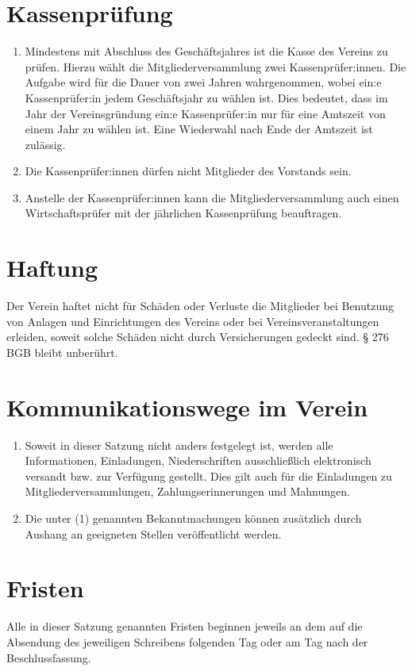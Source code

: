 \documentclass[12pt]{article}
\begin{document}
\section{Kassenprüfung}
\begin{enumerate}[label=(\arabic*)]
	\item Mindestens mit Abschluss des Geschäftsjahres ist die Kasse des Vereins zu prüfen. Hierzu wählt
	      die Mitgliederversammlung zwei Kassenprüfer:innen. Die Aufgabe wird für die Dauer von zwei Jahren
	      wahrgenommen, wobei ein:e Kassenprüfer:in jedem Geschäftsjahr zu wählen ist. Dies bedeutet,
	      dass im Jahr der Vereinsgründung ein:e Kassenprüfer:in nur für eine Amtszeit von einem Jahr zu
	      wählen ist. Eine Wiederwahl nach Ende der Amtszeit ist zulässig.
	\item Die Kassenprüfer:innen dürfen nicht Mitglieder des Vorstands sein.
	\item Anstelle der Kassenprüfer:innen kann die Mitgliederversammlung auch einen Wirtschaftsprüfer
	      mit der jährlichen Kassenprüfung beauftragen.
\end{enumerate}

\section{Haftung}
Der Verein haftet nicht für Schäden oder Verluste die Mitglieder bei Benutzung von Anlagen und
Einrichtungen des Vereins oder bei Vereinsveranstaltungen erleiden, soweit solche Schäden nicht
durch Versicherungen gedeckt sind. § 276 BGB bleibt unberührt.

\section{Kommunikationswege im Verein}
\begin{enumerate}[label=(\arabic*)]
	\item  Soweit in dieser Satzung nicht anders festgelegt ist, werden alle Informationen, Einladungen,
	      Niederschriften ausschließlich elektronisch versandt bzw. zur Verfügung gestellt. Dies gilt auch für
	      die Einladungen zu Mitgliederversammlungen, Zahlungserinnerungen und Mahnungen.
	\item Die unter (1) genannten Bekanntmachungen können zusätzlich durch Aushang an geeigneten
	      Stellen veröffentlicht werden.
\end{enumerate}

\section{Fristen}
Alle in dieser Satzung genannten Fristen beginnen jeweils an dem auf die Absendung des jeweiligen
Schreibens folgenden Tag oder am Tag nach der Beschlussfassung.
\end{document}
